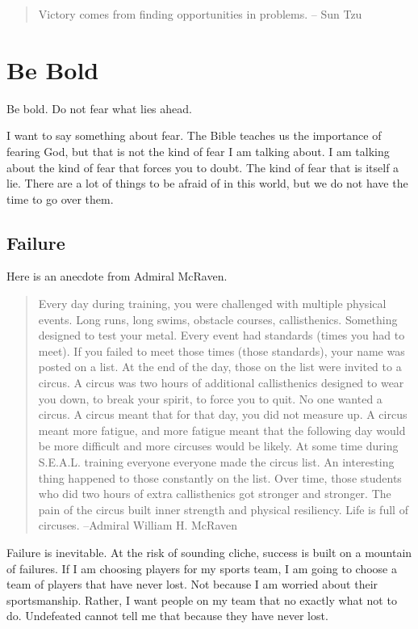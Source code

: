 \documentclass[11pt,a4paper,sans]{article}
\begin{document}
\begin{quote}
    Victory comes from finding opportunities in problems. – Sun Tzu
\end{quote}

\section{Be Bold}
Be bold. Do not fear what lies ahead.

I want to say something about fear. The Bible teaches us the importance of fearing God, but that is not the kind of fear I am talking about. I am talking about the kind of fear that forces you to doubt. The kind of fear that is itself a lie. There are a lot of things to be afraid of in this world, but we do not have the time to go over them. 

\subsection{Failure}

Here is an anecdote from Admiral McRaven. 
\begin{quote}
    Every day during training, you were challenged with multiple physical events. Long runs, long swims, obstacle courses, callisthenics. Something designed to test your metal. Every event had standards (times you had to meet). If you failed to meet those times (those standards), your name was posted on a list. At the end of the day, those on the list were invited to a circus. A circus was two hours of additional callisthenics designed to wear you down, to break your spirit, to force you to quit. No one wanted a circus. A circus meant that for that day, you did not measure up. A circus meant more fatigue, and more fatigue meant that the following day would be more difficult and more circuses would be likely. At some time during S.E.A.L. training everyone everyone made the circus list. An interesting thing happened to those constantly on the list. Over time, those students who did two hours of extra callisthenics got stronger and stronger. The pain of the circus built inner strength and physical resiliency. Life is full of circuses. --Admiral William H. McRaven
\end{quote}

Failure is inevitable. At the risk of sounding cliche, success is built on a mountain of failures. If I am choosing players for my sports team, I am going to choose a team of players that have never lost. Not because I am worried about their sportsmanship. Rather, I want people on my team that no exactly what not to do. Undefeated cannot tell me that because they have never lost.
\end{document}
